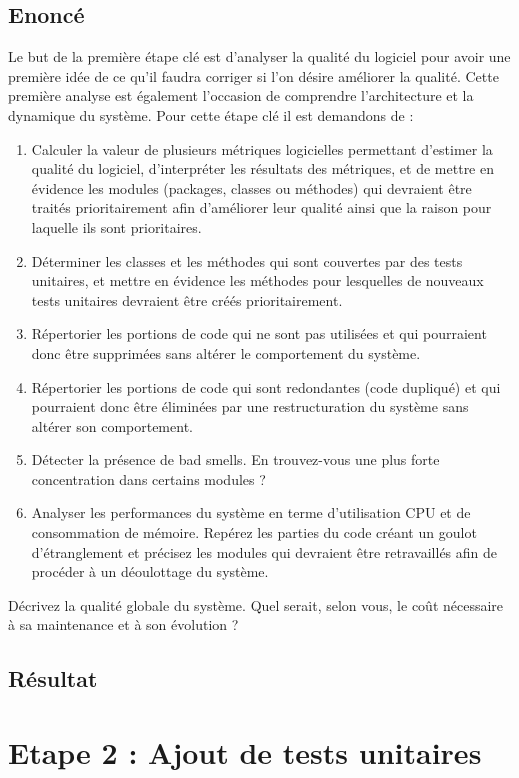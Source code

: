 \documentclass[12pt,a4paper,final]{article}
\begin{document}
\subsection{Enoncé}
Le but de la première étape clé est d'analyser la qualité du logiciel pour avoir une première idée de ce qu'il faudra corriger si l'on désire améliorer la qualité. Cette première analyse est également l'occasion de comprendre l'architecture et la dynamique du système.
Pour cette étape clé il est demandons de :
\begin{enumerate}
\item Calculer la valeur de plusieurs métriques logicielles permettant d'estimer la qualité du logiciel, d'interpréter les résultats des métriques, et de mettre en évidence les modules (packages, classes ou méthodes) qui devraient être traités prioritairement afin d'améliorer leur qualité ainsi que la raison pour laquelle ils sont prioritaires.
\item Déterminer les classes et les méthodes qui sont couvertes par des tests unitaires, et mettre en évidence les méthodes pour lesquelles de nouveaux tests unitaires devraient être créés prioritairement.
\item Répertorier les portions de code qui ne sont pas utilisées et qui pourraient donc être supprimées sans altérer le comportement du système.
\item Répertorier les portions de code qui sont redondantes (code dupliqué) et qui pourraient donc être éliminées par une restructuration du système sans altérer son comportement.
\item Détecter la présence de bad smells. En trouvez-vous une plus forte concentration dans certains modules ?
\item Analyser les performances du système en terme d'utilisation CPU et de consommation de mémoire. Repérez les parties du code créant un goulot d'étranglement et précisez les modules qui devraient être retravaillés afin de procéder à un déoulottage du système.
\end{enumerate}
Décrivez la qualité globale du système. Quel serait, selon vous, le coût nécessaire à sa maintenance et à son évolution ?
\subsection{Résultat}



\section{Etape 2 : Ajout de tests unitaires}\label{sec:etape2}
\end{document}
